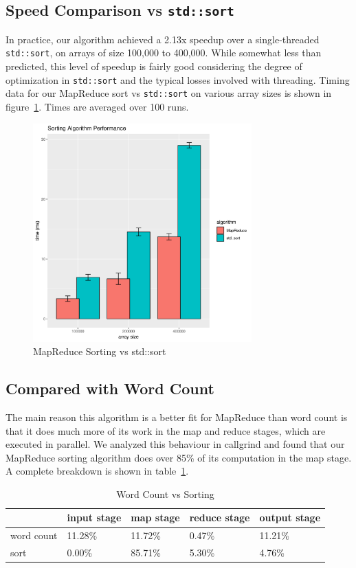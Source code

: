 \documentclass[12pt, letterpaper]{article}
\begin{document}
\subsection{Speed Comparison vs \texttt{std::sort}}
	In practice, our algorithm achieved a 2.13x speedup over a single-threaded \texttt{std::sort}, on arrays of size 100,000 to 400,000.
	While somewhat less than predicted, this level of speedup is fairly good considering the degree of optimization in \texttt{std::sort} and the typical losses involved with threading.
	Timing data for our MapReduce sort vs \texttt{std::sort} on various array sizes is shown in figure~\ref{fig:sort-timing}. Times are averaged over 100 runs.

	\begin{figure}[!h]
	\centering
	\includegraphics[width=0.75\textwidth]{sort-timing}
	\caption{MapReduce Sorting vs std::sort\label{fig:sort-timing}}
	\end{figure}

\subsection{Compared with Word Count}
	The main reason this algorithm is a better fit for MapReduce than word count is that it does much more of its work in the map and reduce stages, which are executed in parallel.
	We analyzed this behaviour in callgrind and found that our MapReduce sorting algorithm does over 85\% of its computation in the map stage.
	A complete breakdown is shown in table~\ref{table:sortVwordcount}.

	\begin{table}[!h]\centering
	\renewcommand{\arraystretch}{1.3}
		\begin{tabular}{@{}lllll@{}}
			\toprule
			 & input stage & map stage & reduce stage & output stage\\ \midrule
			word count	&11.28\%	&11.72\%	&0.47\%	&11.21\%\\
			sort		&0.00\%		&85.71\%	&5.30\%	&4.76\%	\\
			\bottomrule
		\end{tabular}
		\caption{Word Count vs Sorting\label{table:sortVwordcount}}
	\end{table}
\end{document}
